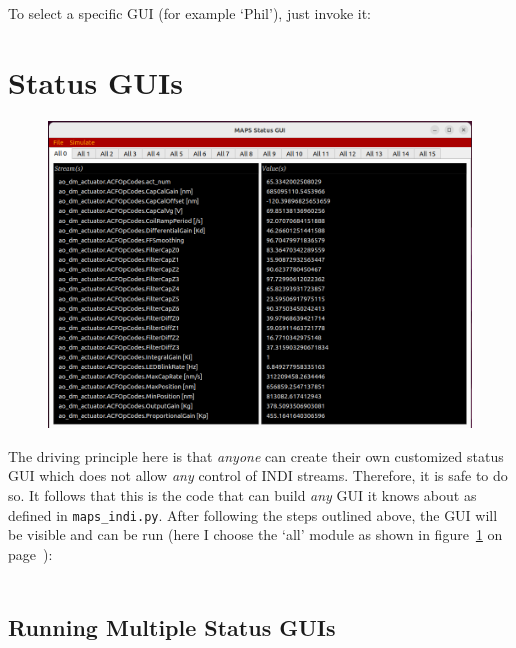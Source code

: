 \documentclass[12pt,twoside]{article}
\begin{document}
To select a specific GUI (for example `Phil'), just invoke it: \\

\noindent  {}

\section{Status GUIs}
\label{Status GUIs}
\begin{figure}[!h]
 \centering
 \includegraphics[width=0.5\linewidth]{MapsStatusGui.png}
 \caption{}
 \label{MapsStatusGui}
\end{figure}

The driving principle here is that \emph{anyone} can create their own customized status GUI
which does not allow \emph{any} control of INDI streams. Therefore, it is safe to do so.
It follows that this is the code that can build \emph{any} GUI it knows about as defined in {\tt maps\_indi.py}.
After following the steps outlined above, the GUI will be visible and can be run (here I choose the `all' module as
shown in figure~\ref{MapsStatusGui} on page~\pageref{MapsStatusGui}): \\

\noindent  {} \\

\subsection{Running Multiple Status GUIs}
\label{Running Multiple Status GUIs}

\noindent  {}
\end{document}
